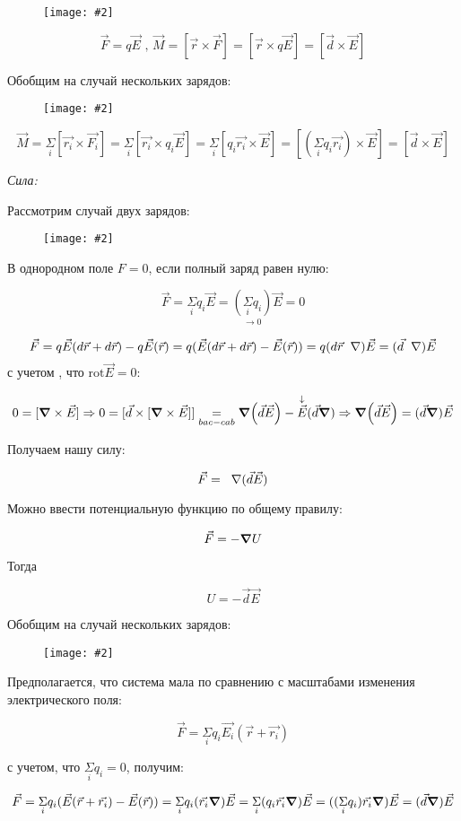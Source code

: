 \documentclass[a4paper,12pt]{article}
\newcommand{\kr}[1]{\textit{#1}}
\newcommand{\fc}[1]{\[#1\]}
\newcommand{\mm}[1]{\mathrm{#1}}
\newcommand{\gradd}{\hspace{0.2cm}\scriptsize \nabla}
\newcommand{\imc}[2][0.7\textwidth]{%
    \begin{figure}[h!]
        \centering
        \texttt{[image: \#2]}
    \end{figure}%
}
\begin{document}
\imc[0.45\textwidth]{17.png}


\fc{\vec{F} = q\vec{E} \text{ , } \vec{M} = [\vec{r} \times \vec{F}]=[\vec{r} \times q\vec{E}]=[\vec{d} \times \vec{E}]}

Обобщим на случай нескольких зарядов:

\imc[0.45\textwidth]{18.png}

\fc{\vec{M}=\underset{i}{\Sigma}[\vec{r_i} \times \vec{F_i}]=\underset{i}{\Sigma}[\vec{r_i} \times q_i\vec{E}]=\underset{i}{\Sigma}[q_i\vec{r_i} \times \vec{E}]=[(\underset{i}{\Sigma}q_i\vec{r_i}) \times \vec{E}]=[\vec{d} \times \vec{E}]}

\newpage

\kr{Сила:}

Рассмотрим случай двух зарядов:

\imc[0.45\textwidth]{19.png}

В однородном поле $F=0$, если полный заряд равен нулю:

\fc{\vec{F}=\underset{i}{\Sigma}q_i\vec{E}=\underset{\rightarrow0}{(\underset{i}{\Sigma}q_i)}\vec{E}=0}

\fc{\vec{F}=q\vec{E}(d\vec{r}+d\vec{r})-q\vec{E}(\vec{r})=q(\vec{E}(d\vec{r}+d\vec{r})-\vec{E}(\vec{r}))=q(d\vec{r}\gradd)\vec{E}=(\vec{d}\gradd)\vec{E}}
с учетом , что $\mm{rot}\vec{E}=0$:

\fc{0=[\grad \times \vec{E}]\Rightarrow 0=[\vec{d}\times[\grad\times\vec{E}]]\underset{bac-cab}{=}\grad(\vec{d}\vec{E})-\overset{\downarrow}{\vec{E}}(\vec{d}\grad)\Rightarrow \grad(\vec{d}\vec{E})=(\vec{d}\grad)\vec{E}}

Получаем нашу силу:

\fc{\vec{F}=\gradd(\vec{d}\vec{E})}

Можно ввести потенциальную функцию по общему правилу:

\fc{\vec{F}=-\grad U}

Тогда 

\fc{U=-\vec{d}\vec{E}}

\newpage

Обобщим на случай нескольких зарядов:

\imc[0.45\textwidth]{20.png}

Предполагается, что система мала по сравнению с масштабами изменения электрического поля:

\fc{\vec{F}=\underset{i}{\Sigma}q_i\vec{E_i}(\vec{r}+\vec{r_i})}

с учетом, что $\underset{i}{\Sigma}q_i=0$, получим:

\fc{\vec{F}=\underset{i}{\Sigma}q_i(\vec{E}(\vec{r}+\vec{r_i})-\vec{E}(\vec{r}))=\underset{i}{\Sigma}q_i(\vec{r_i}\grad)\vec{E}=\underset{i}{\Sigma}(q_i\vec{r_i}\grad)\vec{E}=((\underset{i}{\Sigma}q_i)\vec{r_i}\grad)\vec{E}=(\vec{d}\grad)\vec{E}}
\end{document}
